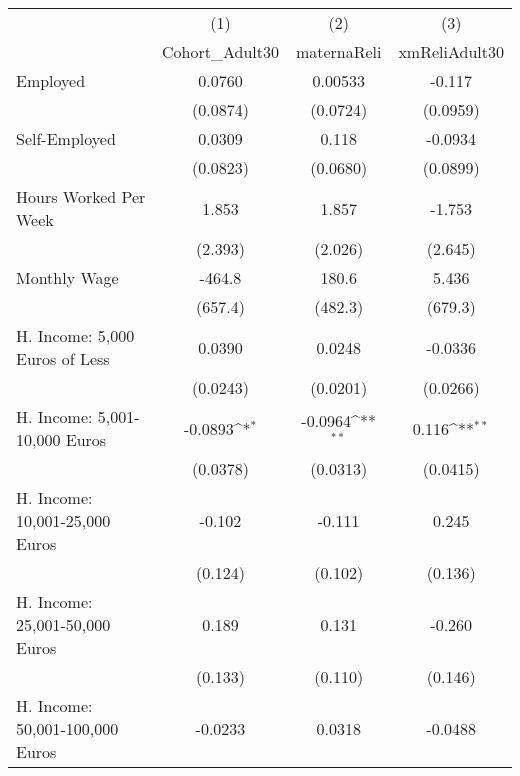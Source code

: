 {
\def\sym#1{\ifmmode^{#1}\else\(^{#1}\)\fi}
\begin{tabular}{l*{3}{c}}
\hline\hline
            &\multicolumn{1}{c}{(1)}&\multicolumn{1}{c}{(2)}&\multicolumn{1}{c}{(3)}\\
            &\multicolumn{1}{c}{Cohort\_Adult30}&\multicolumn{1}{c}{maternaReli}&\multicolumn{1}{c}{xmReliAdult30}\\
\hline
Employed    &      0.0760         &     0.00533         &      -0.117         \\
            &    (0.0874)         &    (0.0724)         &    (0.0959)         \\
[1em]
Self-Employed&      0.0309         &       0.118         &     -0.0934         \\
            &    (0.0823)         &    (0.0680)         &    (0.0899)         \\
[1em]
Hours Worked Per Week&       1.853         &       1.857         &      -1.753         \\
            &     (2.393)         &     (2.026)         &     (2.645)         \\
[1em]
Monthly Wage&      -464.8         &       180.6         &       5.436         \\
            &     (657.4)         &     (482.3)         &     (679.3)         \\
[1em]
H. Income: 5,000 Euros of Less&      0.0390         &      0.0248         &     -0.0336         \\
            &    (0.0243)         &    (0.0201)         &    (0.0266)         \\
[1em]
H. Income: 5,001-10,000 Euros&     -0.0893\sym{*}  &     -0.0964\sym{**} &       0.116\sym{**} \\
            &    (0.0378)         &    (0.0313)         &    (0.0415)         \\
[1em]
H. Income: 10,001-25,000 Euros&      -0.102         &      -0.111         &       0.245         \\
            &     (0.124)         &     (0.102)         &     (0.136)         \\
[1em]
H. Income: 25,001-50,000 Euros&       0.189         &       0.131         &      -0.260         \\
            &     (0.133)         &     (0.110)         &     (0.146)         \\
[1em]
H. Income: 50,001-100,000 Euros&     -0.0233         &      0.0318         &     -0.0488         \\

\end{tabular}}
